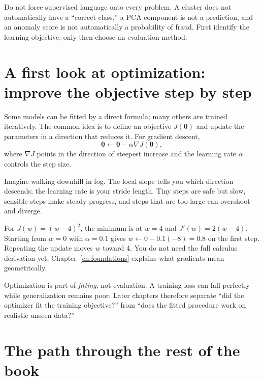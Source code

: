 \begin{pitfall}
Do not force supervised language onto every problem. A cluster does not automatically have a ``correct class,'' a PCA component is not a prediction, and an anomaly score is not automatically a probability of fraud. First identify the learning objective; only then choose an evaluation method.
\end{pitfall}

\section{A first look at optimization: improve the objective step by step}
\label{sec:gradient-descent}

Some models can be fitted by a direct formula; many others are trained iteratively. The common idea is to define an objective $J(\bm{\theta})$ and update the parameters in a direction that reduces it. For gradient descent,
\[
  \bm{\theta}\leftarrow\bm{\theta}-\alpha\nabla J(\bm{\theta}),
\]
where $\nabla J$ points in the direction of steepest increase and the learning rate $\alpha$ controls the step size.

\begin{intuition}
Imagine walking downhill in fog. The local slope tells you which direction descends; the learning rate is your stride length. Tiny steps are safe but slow, sensible steps make steady progress, and steps that are too large can overshoot and diverge.
\end{intuition}

\begin{workedexample}
For $J(w)=(w-4)^2$, the minimum is at $w=4$ and $J'(w)=2(w-4)$. Starting from $w=0$ with $\alpha=0.1$ gives $w\leftarrow0-0.1(-8)=0.8$ on the first step. Repeating the update moves $w$ toward $4$. You do not need the full calculus derivation yet; Chapter~\ref{ch:foundations} explains what gradients mean geometrically.
\end{workedexample}

\begin{keyidea}
Optimization is part of \emph{fitting}, not evaluation. A training loss can fall perfectly while generalization remains poor. Later chapters therefore separate ``did the optimizer fit the training objective?'' from ``does the fitted procedure work on realistic unseen data?''
\end{keyidea}

\section{The path through the rest of the book}

